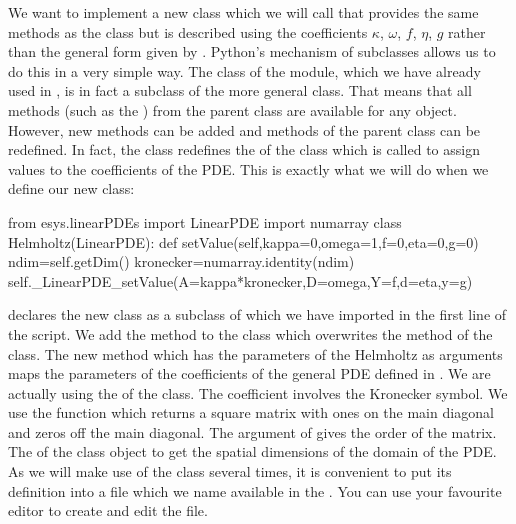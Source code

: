 We want to implement a 
new class which we will call  that provides the same methods as the \LinearPDE class but
is described using the coefficients $\kappa$, $\omega$, $f$, $\eta$, 
$g$ rather than the general form given by . 
Python's mechanism of subclasses allows us to do this in a very simple way.
The \Poisson class of the \linearPDEs module,
which we have already used in , is in fact a subclass of the more general
\LinearPDE class. That means that all methods (such as the )
from the parent class \LinearPDE are available for any \Poisson object. However, new
methods can be added and methods of the parent class can be redefined. In fact,
the \Poisson class redefines the  of the \LinearPDE class which is called to assign 
values to the coefficients of the PDE. This is exactly what we will do when we define 
our new  class:
\begin{python}
from esys.linearPDEs import LinearPDE
import numarray
class Helmholtz(LinearPDE):
   def setValue(self,kappa=0,omega=1,f=0,eta=0,g=0)
        ndim=self.getDim()
        kronecker=numarray.identity(ndim)
        self._LinearPDE_setValue(A=kappa*kronecker,D=omega,Y=f,d=eta,y=g)
\end{python}
 declares the new  class as a subclass 
of \LinearPDE which we have imported in the first line of the script. 
We add the method  to the class which overwrites the 
 method of the \LinearPDE class. The new method which has the 
parameters of the Helmholtz  as arguments 
maps the parameters of the coefficients of the general PDE defined 
in . We are actually using the  of 
the \LinearPDE class. 
The coefficient  involves the Kronecker symbol. We use the
\numarray function  which returns a square matrix with ones on the
main diagonal and zeros off the main diagonal. The argument of  gives the order of the matrix.
The  of the \LinearPDE class object  to get the spatial dimensions of the domain of the
PDE. As we will make use of the  class several times, it is convenient to 
put its definition into a file which we name  available in the \ExampleDirectory.
You can use your favourite editor to create and edit the file.   

